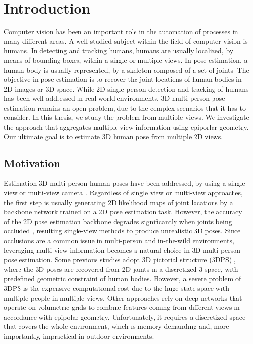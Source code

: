 
\chapter{Introduction}\label{chapter:introduction}

Computer vision has been an important role in the automation of processes in many different areas. A well-studied subject within the field of computer vision is humans. In detecting and tracking humans, humans are usually localized, by means of bounding boxes, within a single or multiple views. In pose estimation, a human body is usually represented, by a skeleton composed of a set of joints. The objective in pose estimation is to recover the joint locations of human bodies in 2D images or 3D space. While 2D single person detection and tracking of humans has been well addressed in real-world environments, 3D multi-person pose estimation remains an open problem, due to the complex scenarios that it has to consider. In this thesis, we study the problem from multiple views. We investigate the approach that aggregates multiple view information using epiporlar geometry. Our ultimate goal is to estimate 3D human pose from multiple 2D views.

\section{Motivation}
Estimation 3D multi-person human poses have been addressed, by using a single view \cite{singleshotmultiperson2018, LCR2019, iskakov2019learnable} or multi-view camera \cite{multiviewpose, 20204DAssociation, voxelpose, 20163DPictorial, dong2019fast, Chen_2020_CVPR}. Regardless of single view or multi-view approaches, the first step is usually generating 2D likelihood maps of joint locations by a backbone network trained on a 2D pose estimation task. However, the accuracy of the 2D pose estimation backbone degrades significantly when joints being occluded \cite{Sarandi18IROSW}, resulting single-view methods to produce unrealistic 3D poses. Since occlusions are a common issue in multi-person and in-the-wild environments, leveraging multi-view information becomes a natural choice in 3D multi-person pose estimation. Some previous studies adopt 3D pictorial structure (3DPS) \cite{20163DPictorial, multiviewpose, 20204DAssociation}, where the 3D poses are recovered from 2D joints in a discretized 3-space, with predefined geometric constraint of human bodies. However, a severe problem of 3DPS is the expensive computational cost due to the huge state space with multiple people in multiple views. Other approaches rely on deep networks that operate on volumetric grids \cite{voxelpose, iskakov2019learnable} to combine features coming from different views in accordance with epipolar geometry. Unfortunately, it requires a discretized space that covers the whole environment, which is memory demanding and, more importantly, impractical in outdoor environments.



